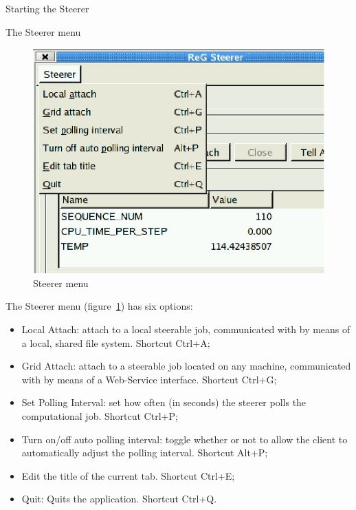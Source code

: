 \documentclass[a4paper,twoside]{article}
\begin{document}
\begin{section}{Starting the Steerer}

\begin{subsection}{The Steerer menu}


\begin{figure}
\centerline{\includegraphics{Steerer_menu.eps}}
\caption{Steerer menu}
\label{fig:steerer_menu}
\end{figure}

The Steerer menu (figure~\ref{fig:steerer_menu}) has six options:
\begin{itemize}
\item Local Attach: attach to a local steerable job, 
communicated with by means of a local, shared file system. 
Shortcut Ctrl+A;
\item Grid Attach: attach to a steerable job located on 
any machine, communicated with by means of a Web-Service 
interface. Shortcut Ctrl+G;
\item Set Polling Interval: set how often (in seconds) the 
steerer polls the computational job. Shortcut Ctrl+P;
\item Turn on/off auto polling interval: toggle whether or not 
to allow the client to automatically adjust the polling 
interval. Shortcut Alt+P;
\item Edit the title of the current tab. Shortcut Ctrl+E;
\item Quit: Quits the application. Shortcut Ctrl+Q.
\end{itemize}


\end{subsection}
\end{section}
\end{document}
